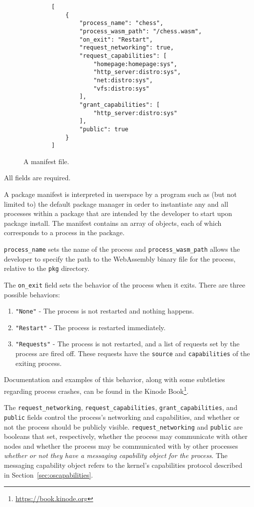 \documentclass[runningheads]{llncs}
\begin{document}
\begin{figure}[H]
    \centering
    \begin{verbatim}
        [
            {
                "process_name": "chess",
                "process_wasm_path": "/chess.wasm",
                "on_exit": "Restart",
                "request_networking": true,
                "request_capabilities": [
                    "homepage:homepage:sys",
                    "http_server:distro:sys",
                    "net:distro:sys",
                    "vfs:distro:sys"
                ],
                "grant_capabilities": [
                    "http_server:distro:sys"
                ],
                "public": true
            }
        ]
    \end{verbatim}
    \caption{A manifest file.}
    \label{fig:example manifest.json}
\end{figure}

All fields are required.

A package manifest is interpreted in userspace by a program such as (but not limited to) the default package manager in order to instantiate any and all processes within a package that are intended by the developer to start upon package install.
The manifest contains an array of objects, each of which corresponds to a process in the package.

\verb|process_name| sets the name of the process and \verb|process_wasm_path| allows the developer to specify the path to the WebAssembly binary file for the process, relative to the \verb|pkg| directory.

The \verb|on_exit| field sets the behavior of the process when it exits. There are three possible behaviors:
\begin{enumerate}
    \item \verb|"None"| - The process is not restarted and nothing happens.
	\item \verb|"Restart"| - The process is restarted immediately.
	\item \verb|"Requests"| - The process is not restarted, and a list of requests set by the process are fired off. These requests have the \verb|source| and \verb|capabilities| of the exiting process.
\end{enumerate}

Documentation and examples of this behavior, along with some subtleties regarding process crashes, can be found in the Kinode Book\footnote{\url{https://book.kinode.org}}.

The \verb|request_networking|, \verb|request_capabilities|, \verb|grant_capabilities|, and \verb|public| fields control the process's networking and capabilities, and whether or not the process should be publicly visible.
\verb|request_networking| and \verb|public| are booleans that set, respectively, whether the process may communicate with other nodes and whether the process may be communicated with by other processes \textit{whether or not they have a messaging capability object for the process}.
The messaging capability object refers to the kernel's capabilities protocol described in Section~\ref{sec:oscapabilities}.
\end{document}
